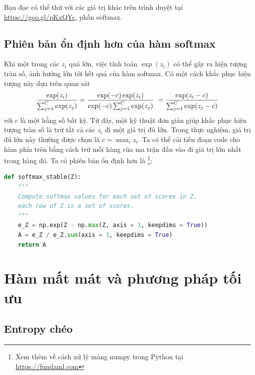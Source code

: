 Bạn đọc có thể thử với các giá trị khác trên trình duyệt tại
\url{https://goo.gl/pKxQYc}, phần softmax.
 
 
\subsection{Phiên bản ổn định hơn của hàm softmax}
 Khi một trong các $z_i$ quá lớn, việc tính toán $\exp(z_i)$ có thể gây ra hiện
tượng tràn số, ảnh hưởng lớn tới kết quả của hàm
softmax. Có một cách khắc phục hiện tượng này dựa trên quan sát
\begin{equation} 
\frac{\exp(z_i)}{\sum_{j=1}^C \exp(z_j)} = \frac{\exp(-c)\exp(z_i)}{\exp(-c)\sum_{j=1}^C \exp(z_j)}\\\ 
= \frac{\exp(z_i-c)}{\sum_{j=1}^C \exp(z_j-c)} 
\end{equation} 
với $c$ là một hằng số bất kỳ. Từ đây, một kỹ thuật đơn giản giúp khắc phục hiện
tượng tràn số là trừ tất cả các $z_i$ đi một giá trị đủ lớn. Trong thực nghiệm,
giá trị đủ lớn này thường được chọn là $c = \max_i z_i$. Ta có thể cải tiến
đoạn code cho hàm \pythoninline{softmax} phía trên bằng cách trừ mỗi hàng của
ma trận đầu vào \pythoninline{Z} đi giá trị lớn nhất trong hàng đó. Ta có phiên
bản ổn định hơn là \pythoninline{softmax_stable}\footnote{Xem thêm về
cách xử lý mảng numpy trong Python tại \url{https://fundaml.com}}:
\begin{lstlisting}[language=Python]
def softmax_stable(Z):
    """
    Compute softmax values for each set of scores in Z.
    each row of Z is a set of scores.    
    """
    e_Z = np.exp(Z - np.max(Z, axis = 1, keepdims = True))
    A = e_Z / e_Z.sum(axis = 1, keepdims = True)
    return A
\end{lstlisting}
 
 
 
 
 
 
\section{Hàm mất mát và phương pháp tối ưu }
 
 
\subsection{Entropy chéo}

